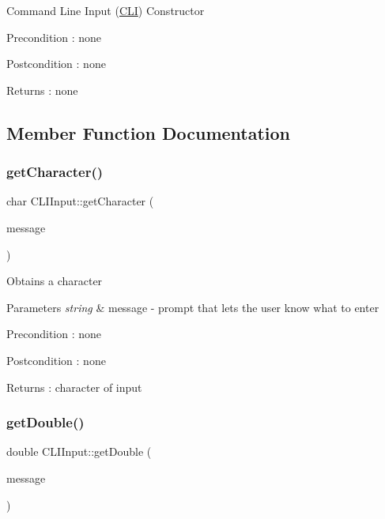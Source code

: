 Command Line Input (\mbox{\hyperlink{class_c_l_i}{C\+LI}}) Constructor \begin{DoxyPrecond}{Precondition}
\+: none 
\end{DoxyPrecond}
\begin{DoxyPostcond}{Postcondition}
\+: none 
\end{DoxyPostcond}
\begin{DoxyReturn}{Returns}
\+: none 
\end{DoxyReturn}


\subsection{Member Function Documentation}
\mbox{\label{class_c_l_i_input_af1fe274ad0d0cda3037506c65d9ba877}} 
\subsubsection{\texorpdfstring{get\+Character()}{getCharacter()}}
{\footnotesize\ttfamily char C\+L\+I\+Input\+::get\+Character (\begin{DoxyParamCaption}\item[{string}]{message }\end{DoxyParamCaption})}

Obtains a character 
\begin{DoxyParams}{Parameters}
{\em string} & message -\/ prompt that lets the user know what to enter \\
\hline
\end{DoxyParams}
\begin{DoxyPrecond}{Precondition}
\+: none 
\end{DoxyPrecond}
\begin{DoxyPostcond}{Postcondition}
\+: none 
\end{DoxyPostcond}
\begin{DoxyReturn}{Returns}
\+: character of input 
\end{DoxyReturn}
\mbox{\label{class_c_l_i_input_a7c80b9716d784128c5b39212337302a9}} 
\subsubsection{\texorpdfstring{get\+Double()}{getDouble()}}
{\footnotesize\ttfamily double C\+L\+I\+Input\+::get\+Double (\begin{DoxyParamCaption}\item[{string}]{message }\end{DoxyParamCaption})}

